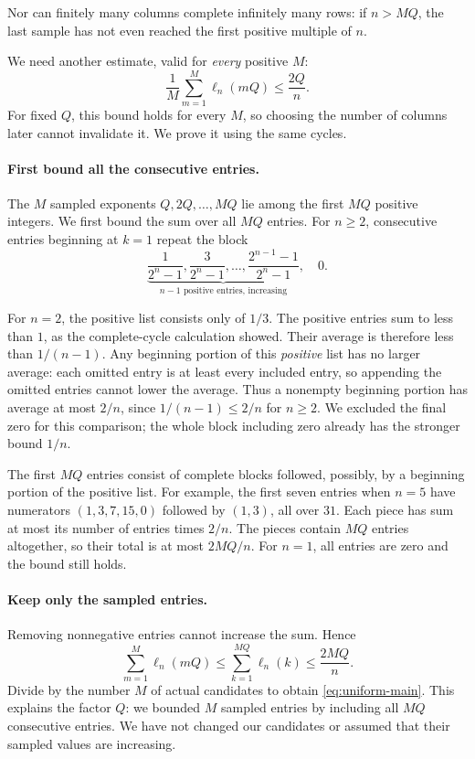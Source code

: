 \documentclass[10pt]{article}
\theoremstyle{plain}
\theoremstyle{definition}
\theoremstyle{remark}
\newcommand{\lft}{\ell}
\begin{document}
Nor can finitely many columns complete infinitely many rows: if $n>MQ$,
the last sample has not even reached the first positive multiple of $n$.

We need another estimate, valid for \emph{every} positive $M$:
\begin{equation}\label{eq:uniform-main}
 \frac1M\sum_{m=1}^{M}\lft_n(mQ)\le\frac{2Q}{n}.
\end{equation}
For fixed $Q$, this bound holds for every $M$, so choosing the number of
columns later cannot invalidate it. We prove it using the same cycles.

\paragraph{First bound all the consecutive entries.}
The $M$ sampled exponents $Q,2Q,\dots,MQ$ lie among the first $MQ$
positive integers. We first bound the sum over all $MQ$ entries.
For $n\ge2$, consecutive entries beginning at $k=1$ repeat the block
\[
 \underbrace{\frac1{2^n-1},\frac3{2^n-1},\dots,
 \frac{2^{n-1}-1}{2^n-1}}_{n-1\text{ positive entries, increasing}},\quad 0.
\]
\begin{samepage}
For $n=2$, the positive list consists only of $1/3$.
The positive entries sum to less than $1$, as the complete-cycle calculation
showed. Their average is therefore less than $1/(n-1)$.
Any beginning portion of this \emph{positive} list has no larger average:
each omitted entry is at least every included entry, so appending the
omitted entries cannot lower the average. Thus a nonempty beginning portion
has average at most $2/n$, since $1/(n-1)\le2/n$ for $n\ge2$.
We excluded the final zero for this comparison; the whole block including
zero already has the stronger bound $1/n$.\par
\end{samepage}

The first $MQ$ entries consist of complete blocks followed, possibly,
by a beginning portion of the positive list. For example, the first seven
entries when $n=5$ have numerators $(1,3,7,15,0)$ followed by $(1,3)$,
all over $31$. Each piece has sum at most its number of entries times $2/n$.
The pieces contain $MQ$ entries altogether, so their total is at most $2MQ/n$.
For $n=1$, all entries are zero and the bound still holds.

\paragraph{Keep only the sampled entries.}
Removing nonnegative entries cannot increase the sum. Hence
\[
 \sum_{m=1}^{M}\lft_n(mQ)
 \le\sum_{k=1}^{MQ}\lft_n(k)\le\frac{2MQ}{n}.
\]
Divide by the number $M$ of actual candidates to obtain
\eqref{eq:uniform-main}. This explains the factor $Q$: we bounded $M$
sampled entries by including all $MQ$ consecutive entries.
We have not changed our candidates or assumed that their sampled values
are increasing.
\end{document}
